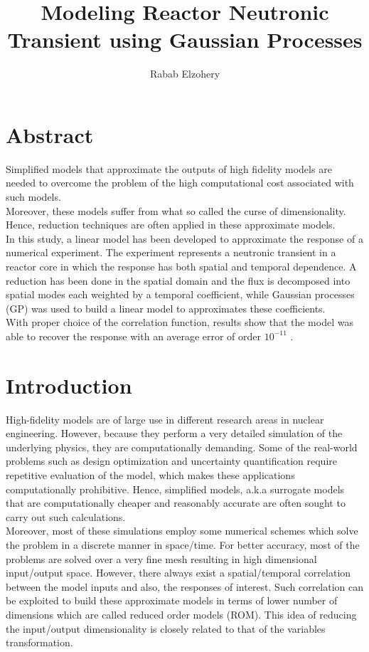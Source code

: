 \documentclass{anstrans}
\title{Modeling Reactor Neutronic Transient using Gaussian Processes}
\author{Rabab Elzohery}
\institute{
Department of Mechanical \& Nuclear Engineering, Kansas State University, Manhattan, KS 66506
}
\begin{document}

\section{Abstract}
Simplified models that approximate the outputs of high fidelity models are needed to overcome the 
problem of the high computational cost associated with such models.\\
Moreover, these models suffer from what so called the curse of dimensionality. Hence, reduction techniques 
are often applied in these approximate models.\\
In this study, a linear model has been developed to approximate the response of a numerical experiment. The experiment represents a neutronic transient in a reactor core in which the response has both spatial and temporal dependence. 
A reduction has been done in the spatial domain and the flux is decomposed into spatial modes each weighted by a temporal coefficient, while Gaussian processes (GP) was used to build a linear model to approximates these coefficients.\\
With proper choice of the correlation function, results show that the model was able to recover the response  with an average error of order $10^{-11}$ .

\section{Introduction}
High-fidelity models are of large use in different research areas in nuclear engineering. However, because they perform a very detailed simulation of the underlying physics, they are computationally demanding.
Some of the real-world problems such as design optimization and uncertainty quantification require repetitive evaluation of the model, which makes these applications computationally prohibitive.
Hence, simplified models, a.k.a surrogate models that are computationally cheaper and reasonably accurate are often sought to carry out such calculations.\\
Moreover, most of these simulations employ some numerical schemes which solve the problem in a discrete manner in space/time. For better accuracy, most of the problems are solved over a very fine mesh resulting in high dimensional input/output space.
However, there always exist a spatial/temporal correlation between the model inputs and also, the responses of interest. 
Such correlation can be exploited to build these approximate models in terms of lower number of dimensions which are called reduced order models (ROM). 
This idea of reducing the input/output dimensionality is closely related to that of the variables transformation.
\end{document}
